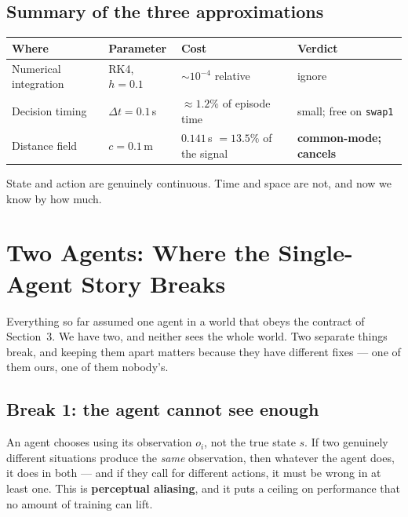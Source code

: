 \documentclass[11pt,a4paper]{article}
\newcommand{\code}[1]{\texttt{\small #1}}
\begin{document}
\subsection{Summary of the three approximations}

\begin{center}
\small
\begin{tabular}{llll}
\toprule
\textbf{Where} & \textbf{Parameter} & \textbf{Cost} & \textbf{Verdict} \\
\midrule
Numerical integration & RK4, $h=0.1$   & $\sim10^{-4}$ relative      & ignore \\
Decision timing       & $\Delta t = 0.1$\,s & $\approx 1.2\%$ of episode time & small; free on \code{swap1} \\
Distance field        & $c = 0.1$\,m   & $0.141$\,s $= 13.5\%$ of the signal & \textbf{common-mode; cancels} \\
\bottomrule
\end{tabular}
\end{center}

State and action are genuinely continuous. Time and space are not, and now we know by how
much.

\section{Two Agents: Where the Single-Agent Story Breaks}

Everything so far assumed one agent in a world that obeys the contract of Section~3. We have
two, and neither sees the whole world. Two separate things break, and keeping them apart
matters because they have different fixes --- one of them ours, one of them nobody's.

\subsection{Break 1: the agent cannot see enough}

An agent chooses using its observation $o_i$, not the true state $s$. If two genuinely
different situations produce the \emph{same} observation, then whatever the agent does, it
does in both --- and if they call for different actions, it must be wrong in at least one.
This is \textbf{perceptual aliasing}, and it puts a ceiling on performance that no amount of
training can lift.
\end{document}
